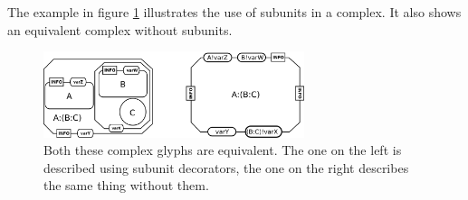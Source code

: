 
The example in figure \ref{fig:techref:complexSubunits} illustrates the use of
subunits in a complex.  It also shows an equivalent complex without
subunits.

\begin{figure}[htb]
  \centering
  \includegraphics[width = 3.0in]{images/complex}
  \caption{Both these complex glyphs are equivalent. The one on the
    left is described using subunit decorators, the one on the right
    describes the same thing without them.}
  \label{fig:techref:complexSubunits}
\end{figure}

